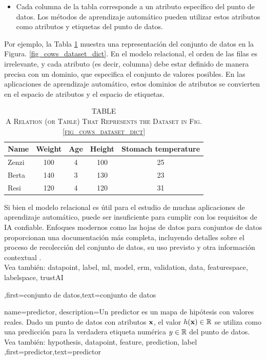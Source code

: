 {{\begin{itemize}
		\item Cada columna de la tabla corresponde a un atributo específico del punto de datos. 
		Los métodos de aprendizaje automático pueden utilizar estos atributos como atributos y etiquetas del punto de datos.
		\end{itemize}
		Por ejemplo, la Tabla \ref{tab:cowdata_dict} muestra una representación del conjunto de datos en la Figura. \ref{fig_cows_dataset_dict}. 
		En el modelo relacional, el orden de las filas es irrelevante, y cada atributo (es decir, columna) debe estar definido de manera precisa con un dominio, que especifica el conjunto de valores posibles.
		En las aplicaciones de aprendizaje automático, estos dominios de atributos se convierten en el espacio de atributos y el espacio de etiquetas. 
		\begin{table}[H]
			\caption*{
				\centering 
				\scshape TABLE \thetable \\[0.5ex]
				\scshape A Relation (or Table) That Represents the Dataset in Fig. \ref{fig_cows_dataset_dict} 
			}
			\label{tab:cowdata_dict} 
			\centering
			\begin{tabular}{lcccc}
				\hline
				\textbf{Name} & \textbf{Weight} & \textbf{Age} & \textbf{Height} & \textbf{Stomach temperature} \\
				\hline
				Zenzi & 100 & 4 & 100 & 25 \\
				Berta & 140 & 3 & 130 & 23 \\
				Resi  & 120 & 4 & 120 & 31 \\
				\hline
			\end{tabular}
		\end{table}
 Si bien el modelo relacional es útil para el estudio de muchas aplicaciones de aprendizaje automático, puede ser insuficiente 
 para cumplir con los requisitos de IA confiable. Enfoques modernos como las hojas de datos para conjuntos de datos proporcionan una documentación más completa,   
 incluyendo detalles sobre el proceso de recolección del conjunto de datos, su uso previsto y otra información contextual 
 \cite{DatasheetData2021}.
 \\
		Vea también: \gls{datapoint}, \gls{label}, \gls{ml}, \gls{model},  \gls{erm}, \gls{validation}, \gls{data}, \gls{featurespace}, \gls{labelspace}, \gls{trustAI}},first={conjunto de datos},text={conjunto de datos}  
}

{name={predictor},
	description={Un predictor es un mapa de hipótesis con valores reales.
		Dado un punto de datos con atributos ${\bf x}$, el valor 
		$h({\bf x}) \in \mathbb{R}$ se utiliza como una predicción para la verdadera  
		etiqueta numérica $y \in \mathbb{R}$ del punto de datos. 
		\\
		Vea también: \gls{hypothesis}, \gls{datapoint}, \gls{feature}, \gls{prediction}, \gls{label} },first={predictor},text={predictor}  
}

